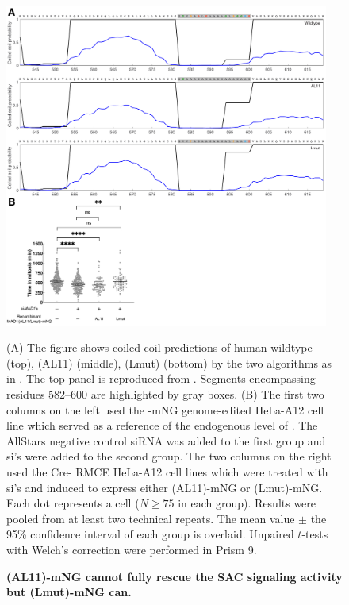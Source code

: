 \begin{figure}
    \centering
    \includegraphics[width=0.95\textwidth]{chapters/figures/AL11+Lmut.pdf}
    \caption{\textbf{(AL11)-mNG cannot fully rescue the SAC signaling activity but (Lmut)-mNG can.}}
    \noindent\justifying (A) The figure shows coiled-coil predictions of human wildtype  (top), (AL11) (middle), (Lmut) (bottom) by the two algorithms as in . The top panel is reproduced from . Segments encompassing residues 582--600 are highlighted by gray boxes. (B) The first two columns on the left used the -mNG genome-edited HeLa-A12 cell line which served as a reference of the endogenous level of . The AllStars negative control siRNA was added to the first group and si's were added to the second group. The two columns on the right used the Cre- RMCE HeLa-A12 cell lines which were treated with si's and induced to express either (AL11)-mNG or (Lmut)-mNG. Each dot represents a cell ($N \geq 75$ in each group). Results were pooled from at least two technical repeats. The mean value $\pm$ the 95\% confidence interval of each group is overlaid. Unpaired $t$-tests with Welch's correction were performed in Prism 9.
    \label{AL11+Lmut}
\end{figure}

